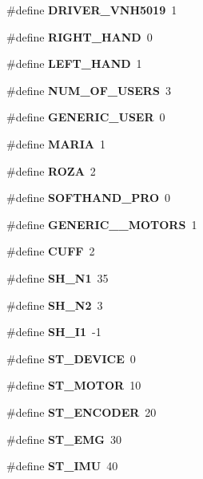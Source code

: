 \begin{DoxyCompactItemize}
\#define {\bfseries D\+R\+I\+V\+E\+R\+\_\+\+V\+N\+H5019}~1
\item 
\mbox{\label{globals_8h_a5d1d275cfec76197e014fe4d58f2e569}} 
\#define {\bfseries R\+I\+G\+H\+T\+\_\+\+H\+A\+ND}~0
\item 
\mbox{\label{globals_8h_a2eff09387fb5d20d8af4fa186ae37c4d}} 
\#define {\bfseries L\+E\+F\+T\+\_\+\+H\+A\+ND}~1
\item 
\mbox{\label{globals_8h_aa518fecbba4980ebda2090f02ceb5e52}} 
\#define {\bfseries N\+U\+M\+\_\+\+O\+F\+\_\+\+U\+S\+E\+RS}~3
\item 
\mbox{\label{globals_8h_ac524d0f906498efbd1182856cd8c80de}} 
\#define {\bfseries G\+E\+N\+E\+R\+I\+C\+\_\+\+U\+S\+ER}~0
\item 
\mbox{\label{globals_8h_a8595fed7fe248547047c468802057a0d}} 
\#define {\bfseries M\+A\+R\+IA}~1
\item 
\mbox{\label{globals_8h_a7617063d52fc2d1ba6d0276770aec732}} 
\#define {\bfseries R\+O\+ZA}~2
\item 
\mbox{\label{globals_8h_a47a1fa8e1e5435f664749ab44e163bae}} 
\#define {\bfseries S\+O\+F\+T\+H\+A\+N\+D\+\_\+\+P\+RO}~0
\item 
\mbox{\label{globals_8h_a577f879b1a05acd55b1d56412a17e13f}} 
\#define {\bfseries G\+E\+N\+E\+R\+I\+C\+\_\+\_\+\+M\+O\+T\+O\+RS}~1
\item 
\mbox{\label{globals_8h_ac5a0bd9be15f1dcd0ba86f27d3dbda50}} 
\#define {\bfseries C\+U\+FF}~2
\item 
\#define \textbf{ S\+H\+\_\+\+N1}~35
\item 
\#define \textbf{ S\+H\+\_\+\+N2}~3
\item 
\#define \textbf{ S\+H\+\_\+\+I1}~-\/1
\item 
\mbox{\label{globals_8h_a5f8f4a24628c7191c9adde97ae751bf2}} 
\#define {\bfseries S\+T\+\_\+\+D\+E\+V\+I\+CE}~0
\item 
\mbox{\label{globals_8h_a911881bfa4a82a79f351f7a8a8ea40d1}} 
\#define {\bfseries S\+T\+\_\+\+M\+O\+T\+OR}~10
\item 
\mbox{\label{globals_8h_a642639720f787f90dab85f94d4be660c}} 
\#define {\bfseries S\+T\+\_\+\+E\+N\+C\+O\+D\+ER}~20
\item 
\mbox{\label{globals_8h_afca454140c3233621eaa719a25a1c4b5}} 
\#define {\bfseries S\+T\+\_\+\+E\+MG}~30
\item 
\mbox{\label{globals_8h_a6f71b4081fa44d0458fa27e891527315}} 
\#define {\bfseries S\+T\+\_\+\+I\+MU}~40
\item 
\mbox{\label{globals_8h_a3aacefdd9f8dddbb7b55bcd39bf22792}} 

\end{DoxyCompactItemize}
